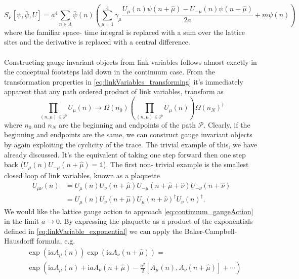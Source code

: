 \documentclass[a4paper,10pt]{article}
\begin{document}
\begin{equation}\label{eq:naiveFermionAction}
S_{F}[\psi, \bar{\psi}, U]=a^{4} \sum_{n \in \Lambda} \bar{\psi}(n)\left(\sum_{\mu=1}^{4} \gamma_{\mu} \frac{U_{\mu}(n) \psi(n+\hat{\mu})-U_{-\mu}(n) \psi(n-\hat{\mu})}{2 a}+m \psi(n)\right)
\end{equation}
where the familiar space- time integral is replaced with a sum over the lattice sites and the derivative is replaced with a central difference.\\\\Constructing gauge invariant objects from link variables follows almost exactly in the conceptual footsteps laid down in the continuum case. From the transformation properties in \eqref{eq:linkVariables_transforming} it's immediately apparent that any path ordered product of link variables, transform as 
\begin{equation}
\prod_{(n, \mu) \in \mathcal{P}} U_{\mu}(n) \rightarrow \Omega(n_0)\left( \prod_{(n, \mu) \in \mathcal{P}} U_{\mu}(n) \right)\Omega(n_N)^\dagger
\end{equation}
where $n_0$ and $n_N$ are the beginning and endpoints of the path $\mathcal{P}$. Clearly, if the beginning and endpoints are the same, we can construct gauge invariant objects by again exploiting the cyclicity of the trace. The trivial example of this, we have already discussed. It's the equivalent of taking one step forward then one step back ($U_{\mu}(n)U_{-\mu}(n+\hat{\mu}) = \mathbb{1}$). The first non- trivial example is the smallest closed loop of link variables, known as a plaquette
\begin{equation}\label{eq:plaquette}
\begin{aligned}
U_{\mu \nu}(n) &=U_{\mu}(n) U_{\nu}(n+\hat{\mu}) U_{-\mu}(n+\hat{\mu}+\hat{\nu}) U_{-\nu}(n+\hat{\nu}) \\
&=U_{\mu}(n) U_{\nu}(n+\hat{\mu}) U_{\mu}(n+\hat{\nu})^{\dagger} U_{\nu}(n)^{\dagger}.
\end{aligned}
\end{equation}
We would like the lattice gauge action to approach \eqref{eq:continuum_gaugeAction} in the limit $a\rightarrow 0$. By expressing the plaquette as a product of the exponentials defined in \eqref{eq:linkVariable_exponential} we can apply the Baker-Campbell-Hausdorff formula, e.g.
\begin{equation}
\begin{aligned}
&\exp \left(\mathrm{i} a A_{\mu}(n)\right)\exp \left(\mathrm{i} a A_{\nu}(n+\hat{\mu})\right) =\\ &\exp \left(\mathrm{i} a A_{\mu}(n)+\mathrm{i} a A_{\nu}(n+\hat{\mu})-\frac{a^{2}}{2}\left[A_{\mu}(n), A_{\nu}(n+\hat{\mu})\right]+\cdots\right) 
\end{aligned}
\end{equation}
\end{document}

